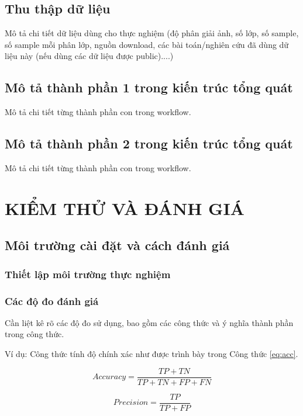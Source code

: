 \section{Thu thập dữ liệu}
Mô tả chi tiết dữ liệu dùng cho thực nghiệm (độ phân giải ảnh, số lớp, số sample, số sample mỗi phân lớp, nguồn download, các bài toán/nghiên cứu đã dùng dữ liệu này (nếu dùng các dữ liệu được public)....)

\section{Mô tả thành phần 1 trong kiến trúc tổng quát}
Mô tả chi tiết từng thành phần con trong workflow.
\section{Mô tả thành phần 2 trong kiến trúc tổng quát}
Mô tả chi tiết từng thành phần con trong workflow.

\chapter{KIỂM THỬ VÀ ĐÁNH GIÁ}
\startcontents[chapters]

\section{Môi trường cài đặt và cách đánh giá}
\subsection{Thiết lập môi trường thực nghiệm}

\subsection{Các độ đo đánh giá}
Cần liệt kê rõ các độ đo sử dụng, bao gồm các công thức và ý nghĩa thành phần trong công thức.

Ví dụ: Công thức tính độ chính xác như được trình bày trong Công thức \ref{eq:acc}.



\begin{equation}\label{eq:acc}
Accuracy = \frac{TP+TN}{TP+TN+FP+FN}   
\end{equation}

\begin{equation}
Precision = \frac{TP}{TP+FP}
\end{equation}

